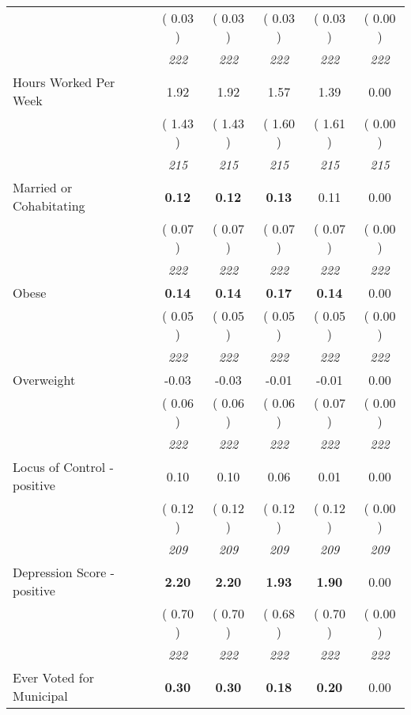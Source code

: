 \begin{tabular}{l c c c c c}
& (     0.03 ) & (     0.03 ) & (     0.03 ) & (     0.03 ) & (     0.00 ) \\
& \textit{ 222 } & \textit{ 222 } & \textit{ 222 } & \textit{ 222 } & \textit{ 222 } \\
Hours Worked Per Week &      1.92 &      1.92 &      1.57 &      1.39 &      0.00 \\
& (     1.43 ) & (     1.43 ) & (     1.60 ) & (     1.61 ) & (     0.00 ) \\
& \textit{ 215 } & \textit{ 215 } & \textit{ 215 } & \textit{ 215 } & \textit{ 215 } \\
Married or Cohabitating & \textbf{      0.12 } & \textbf{      0.12 } & \textbf{      0.13 } &      0.11 &      0.00 \\
& (     0.07 ) & (     0.07 ) & (     0.07 ) & (     0.07 ) & (     0.00 ) \\
& \textit{ 222 } & \textit{ 222 } & \textit{ 222 } & \textit{ 222 } & \textit{ 222 } \\
Obese & \textbf{      0.14 } & \textbf{      0.14 } & \textbf{      0.17 } & \textbf{     0.14} &      0.00 \\
& (     0.05 ) & (     0.05 ) & (     0.05 ) & (     0.05 ) & (     0.00 ) \\
& \textit{ 222 } & \textit{ 222 } & \textit{ 222 } & \textit{ 222 } & \textit{ 222 } \\
Overweight &     -0.03 &     -0.03 &     -0.01 &     -0.01 &      0.00 \\
& (     0.06 ) & (     0.06 ) & (     0.06 ) & (     0.07 ) & (     0.00 ) \\
& \textit{ 222 } & \textit{ 222 } & \textit{ 222 } & \textit{ 222 } & \textit{ 222 } \\
Locus of Control - positive &      0.10 &      0.10 &      0.06 &      0.01 &      0.00 \\
& (     0.12 ) & (     0.12 ) & (     0.12 ) & (     0.12 ) & (     0.00 ) \\
& \textit{ 209 } & \textit{ 209 } & \textit{ 209 } & \textit{ 209 } & \textit{ 209 } \\
Depression Score - positive & \textbf{      2.20 } & \textbf{      2.20 } & \textbf{      1.93 } & \textbf{     1.90} &      0.00 \\
& (     0.70 ) & (     0.70 ) & (     0.68 ) & (     0.70 ) & (     0.00 ) \\
& \textit{ 222 } & \textit{ 222 } & \textit{ 222 } & \textit{ 222 } & \textit{ 222 } \\
Ever Voted for Municipal & \textbf{      0.30 } & \textbf{      0.30 } & \textbf{      0.18 } & \textbf{     0.20} &      0.00 \\

\end{tabular}
